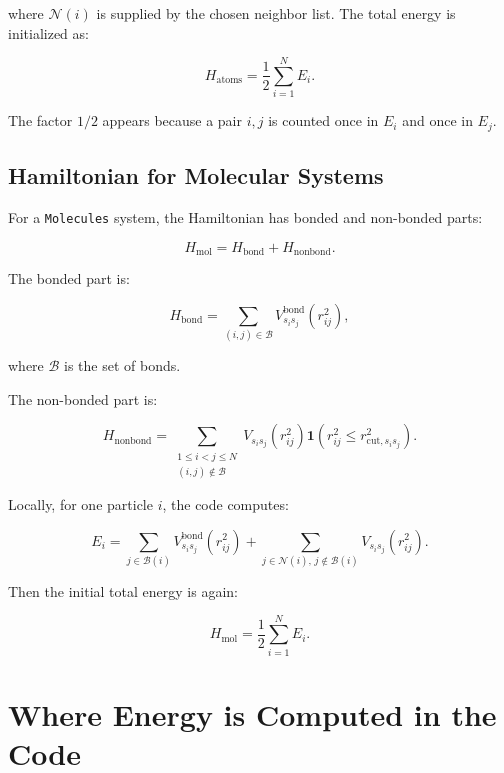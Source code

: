 \documentclass[11pt]{article}
\begin{document}
where \(\mathcal{N}(i)\) is supplied by the chosen neighbor list. The total
energy is initialized as:

\begin{equation}
H_{\mathrm{atoms}} = \frac{1}{2}\sum_{i=1}^N E_i.
\end{equation}

The factor \(1/2\) appears because a pair \(i,j\) is counted once in \(E_i\) and
once in \(E_j\).

\subsection{Hamiltonian for Molecular Systems}

For a \texttt{Molecules} system, the Hamiltonian has bonded and non-bonded parts:

\begin{equation}
H_{\mathrm{mol}}
=
H_{\mathrm{bond}}
+
H_{\mathrm{nonbond}}.
\end{equation}

The bonded part is:

\begin{equation}
H_{\mathrm{bond}}
=
\sum_{(i,j)\in \mathcal{B}}
V_{s_i s_j}^{\mathrm{bond}}(r_{ij}^2),
\end{equation}

where \(\mathcal{B}\) is the set of bonds.

The non-bonded part is:

\begin{equation}
H_{\mathrm{nonbond}}
=
\sum_{\substack{1 \le i < j \le N \\ (i,j)\notin \mathcal{B}}}
V_{s_i s_j}(r_{ij}^2)
\mathbf{1}\!\left(r_{ij}^2 \le r_{\mathrm{cut},s_i s_j}^2\right).
\end{equation}

Locally, for one particle \(i\), the code computes:

\begin{equation}
E_i
=
\sum_{j\in \mathcal{B}(i)}
V_{s_i s_j}^{\mathrm{bond}}(r_{ij}^2)
+
\sum_{j\in \mathcal{N}(i),\, j\notin \mathcal{B}(i)}
V_{s_i s_j}(r_{ij}^2).
\end{equation}

Then the initial total energy is again:

\begin{equation}
H_{\mathrm{mol}} = \frac{1}{2}\sum_{i=1}^N E_i.
\end{equation}

\section{Where Energy is Computed in the Code}
\end{document}
